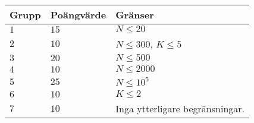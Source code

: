 \noindent
\begin{tabular}{| l | l | p{12cm} |}
  \hline
  Grupp & Poängvärde & Gränser \\ \hline
 
  $1$   & $15$       & $N \leq 20$\\ \hline
  $2$   & $10$       & $N \leq 300$, $K \leq 5$  \\ \hline
  $3$   & $20$       & $N \leq 500$ \\ \hline
  $4$   & $10$       & $N \leq 2000$ \\ \hline
  $5$   & $25$       & $N \leq 10^5$ \\ \hline
  $6$   & $10$       & $K \leq 2$ \\ \hline
  $7$   & $10$       & Inga ytterligare begränsningar. \\ \hline
\end{tabular}
